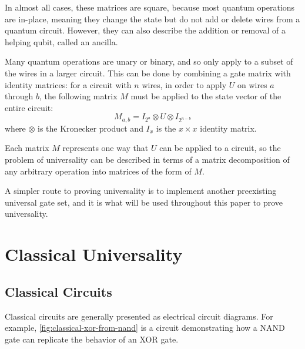 \documentclass[12pt]{article}
\begin{document}
In almost all cases, these matrices are square, because most quantum operations are in-place, meaning they change the state but do not add or delete wires from a quantum circuit. However, they can also describe the addition or removal of a helping qubit, called an ancilla.

Many quantum operations are unary or binary, and so only apply to a subset of the wires in a larger circuit. This can be done by combining a gate matrix with identity matrices: for a circuit with $n$ wires, in order to apply $U$ on wires $a$ through $b$, the following matrix $M$ must be applied to the state vector of the entire circuit:
$$
M_{a, b} = I_{2^a} \otimes U \otimes I_{2^{n - b}}
$$
where $\otimes$ is the Kronecker product and $I_x$ is the $x \times x$ identity matrix.

Each matrix $M$ represents one way that $U$ can be applied to a circuit, so the problem of universality can be described in terms of a matrix decomposition of any arbitrary operation into matrices of the form of $M$.

A simpler route to proving universality is to implement another preexisting universal gate set, and it is what will be used throughout this paper to prove universality.

\section{Classical Universality}
\subsection{Classical Circuits}
Classical circuits are generally presented as electrical circuit diagrams. For example, \autoref{fig:classical-xor-from-nand} is a circuit demonstrating how a NAND gate can replicate the behavior of an XOR gate.
\end{document}
